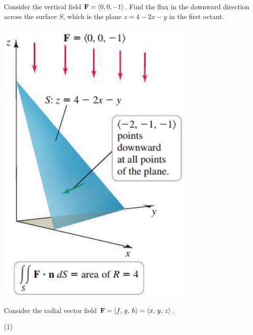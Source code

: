 \documentclass[mathNotesPreamble]{subfiles}
\begin{document}
  \begin{ex*}
    Consider the vertical field $\mathbf F={\left\langle 0,0,-1 \right\rangle}$. Find the flux in the downward direction across the surface $S$, which is the plane $z=4-2x-y$ in the first octant.
  \end{ex*}
  \begin{flushright}
    \includegraphics[width=0.25\linewidth]{images/briggs_17_06/fig17_58}
  \end{flushright}
  \pagebreak

  \begin{ex*}
    Consider the radial vector field $\mathbf F={\left\langle f,\,g,\,h \right\rangle}={\left\langle x,\,y,\,z \right\rangle}$. 
  \end{ex*}
  \begin{tasks}[after-item-skip=\stretch{1}, label=](1)
    \task 
    \task 
  \end{tasks}
  \pagebreak
\end{document}
